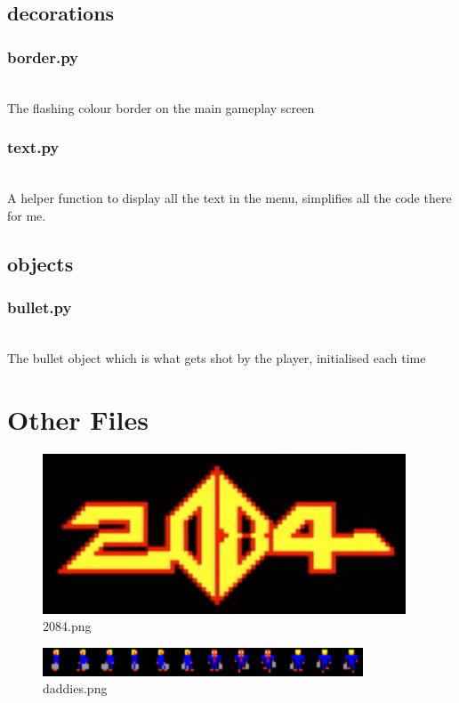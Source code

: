\subsection{decorations}
\subsubsection{border.py}\\
The flashing colour border on the main gameplay screen

\subsubsection{text.py}\\
A helper function to display all the text in the menu, simplifies all the code there for me.

\subsection{objects}
\subsubsection{bullet.py}\\
The bullet object which is what gets shot by the player, initialised each time


\section{Other Files}
\begin{figure}[H]
  \includegraphics[width=0.8\linewidth]{Game Code/sprites/2084.png}
  \centering
  \caption{2084.png}
  \label{fig:HCI5}
\end{figure}

\begin{figure}[H]
  \includegraphics[width=1\linewidth]{Game Code/sprites/daddies.png}
  \centering
  \caption{daddies.png}
  \label{fig:HCI5}
\end{figure}

